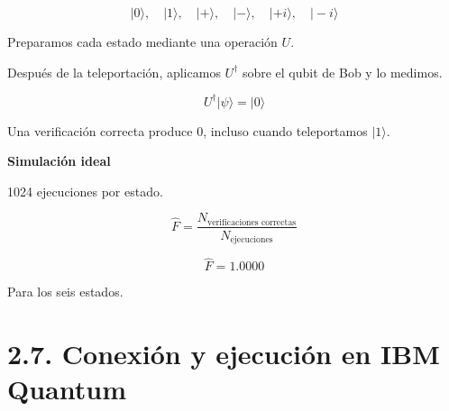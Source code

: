 \documentclass{afitdefense}
\begin{document}
\begin{Center}
\vspace{-.5cm}
\[
|0\rangle,\quad |1\rangle,\quad
|+\rangle,\quad |-\rangle,\quad
|+i\rangle,\quad |-i\rangle
\]

\medskip

\begin{minipage}[c]{0.52\textwidth}
\small

Preparamos cada estado mediante una operación $U$.

\medskip

Después de la teleportación, aplicamos
$U^\dagger$ sobre el qubit de Bob
y lo medimos.

\[
U^\dagger|\psi\rangle=|0\rangle
\]

Una verificación correcta produce $0$,
incluso cuando teleportamos $|1\rangle$.

\end{minipage}
\hfill
\begin{minipage}[c]{0.44\textwidth}
\small
\centering

\textbf{Simulación ideal}

\medskip

1024 ejecuciones por estado.

\[
\widehat{F}
=
\frac{N_{\text{verificaciones correctas}}}
{N_{\text{ejecuciones}}}
\]

\[
\boxed{\widehat{F}=1.0000}
\]

Para los seis estados.

\end{minipage}

\medskip


\end{Center}


\section{2.7. Conexión y ejecución en IBM Quantum}
\end{document}
